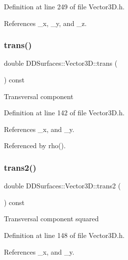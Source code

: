 Definition at line 249 of file Vector3\+D.\+h.



References \+\_\+x, \+\_\+y, and \+\_\+z.

\hypertarget{class_d_d_surfaces_1_1_vector3_d_a48d0c066e59e6307b0ccbb950deab045}{}\label{class_d_d_surfaces_1_1_vector3_d_a48d0c066e59e6307b0ccbb950deab045} 
\subsubsection{\texorpdfstring{trans()}{trans()}}
{\footnotesize\ttfamily double D\+D\+Surfaces\+::\+Vector3\+D\+::trans (\begin{DoxyParamCaption}{ }\end{DoxyParamCaption}) const\hspace{0.3cm}{\ttfamily [inline]}}

Transversal component 

Definition at line 142 of file Vector3\+D.\+h.



References \+\_\+x, and \+\_\+y.



Referenced by rho().

\hypertarget{class_d_d_surfaces_1_1_vector3_d_ad75dc7ab2c8736088a6a5ae92034cfbb}{}\label{class_d_d_surfaces_1_1_vector3_d_ad75dc7ab2c8736088a6a5ae92034cfbb} 
\subsubsection{\texorpdfstring{trans2()}{trans2()}}
{\footnotesize\ttfamily double D\+D\+Surfaces\+::\+Vector3\+D\+::trans2 (\begin{DoxyParamCaption}{ }\end{DoxyParamCaption}) const\hspace{0.3cm}{\ttfamily [inline]}}

Transversal component squared 

Definition at line 148 of file Vector3\+D.\+h.



References \+\_\+x, and \+\_\+y.

\hypertarget{class_d_d_surfaces_1_1_vector3_d_a165238feeb43caeeddb4c1710212610d}{}\label{class_d_d_surfaces_1_1_vector3_d_a165238feeb43caeeddb4c1710212610d} 
